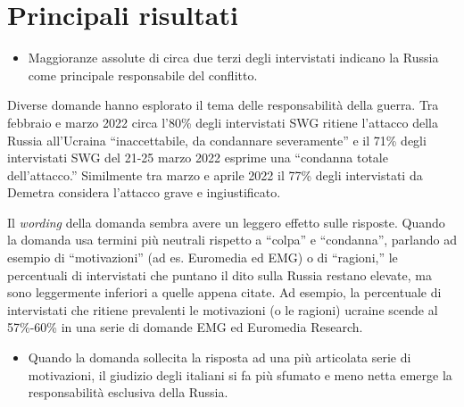 \documentclass[
  openany]{book}
\providecommand{\tightlist}{%
  \setlength{\itemsep}{0pt}\setlength{\parskip}{0pt}}
\begin{document}
\hypertarget{principali-risultati-1}{%
\section{Principali risultati}\label{principali-risultati-1}}

\begin{itemize}
\tightlist
\item
  Maggioranze assolute di circa due terzi degli intervistati indicano la Russia come principale responsabile del conflitto.
\end{itemize}

Diverse domande hanno esplorato il tema delle responsabilità della guerra. Tra febbraio e marzo 2022 circa l'80\% degli intervistati SWG ritiene l'attacco della Russia all'Ucraina ``inaccettabile, da condannare severamente'' e il 71\% degli intervistati SWG del 21-25 marzo 2022 esprime una ``condanna totale dell'attacco.'' Similmente tra marzo e aprile 2022 il 77\% degli intervistati da Demetra considera l'attacco grave e ingiustificato.

Il \emph{wording} della domanda sembra avere un leggero effetto sulle risposte. Quando la domanda usa termini più neutrali rispetto a ``colpa'' e ``condanna'', parlando ad esempio di ``motivazioni'' (ad es. Euromedia ed EMG) o di ``ragioni,'' le percentuali di intervistati che puntano il dito sulla Russia restano elevate, ma sono leggermente inferiori a quelle appena citate. Ad esempio, la percentuale di intervistati che ritiene prevalenti le motivazioni (o le ragioni) ucraine scende al 57\%-60\% in una serie di domande EMG ed Euromedia Research.

\begin{itemize}
\tightlist
\item
  Quando la domanda sollecita la risposta ad una più articolata serie di motivazioni, il giudizio degli italiani si fa più sfumato e meno netta emerge la responsabilità esclusiva della Russia.
\end{itemize}
\end{document}
